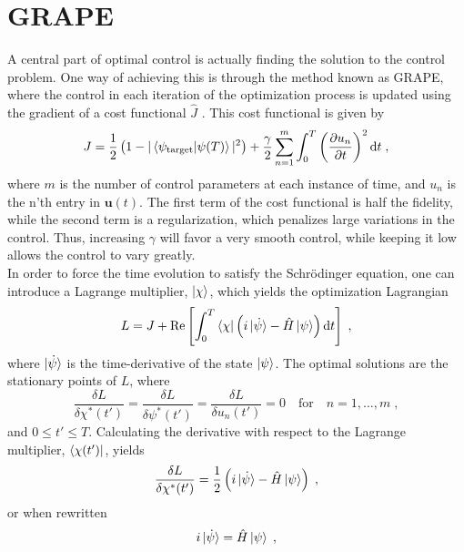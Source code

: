 \section{GRAPE}  %
A central part of optimal control is actually finding the solution to the control problem. One way of achieving this is through the method known as GRAPE, where the control in each iteration of the optimization process is updated using the gradient of a cost functional $\hat{J}$ \cite{QOCT}. This cost functional is given by
\begin{equation}
	J = \frac{1}{2} \left( 1-|\braket{\psi_{\mathrm{target}} | \psi (T)}|^2 \right) + \frac{\gamma}{2} \sum_{n=1}^{m} \int_{0}^{T} \left( \pdv{u_n}{t} \right)^2 \mathrm{d}t \; ,
\end{equation}
where $m$ is the number of control parameters at each instance of time, and $u_n$ is the n'th entry in $\boldsymbol{u}(t)$. The first term of the cost functional is half the fidelity, while the second term is a regularization, which penalizes large variations in the control. Thus, increasing $\gamma$ will favor a very smooth control, while keeping it low allows the control to vary greatly.\\
In order to force the time evolution to satisfy the Schrödinger equation, one can introduce a Lagrange multiplier, $\ket{\chi}$, which yields the optimization Lagrangian
\begin{equation}
	L = J + \Re \left[ \int_{0}^{T} \bra{\chi} \left( i \ket{\dot{\psi}} - \hat{H} \ket{\psi} \right) \mathrm{d}t \right] \; ,
\end{equation} 
where $\ket{\dot{\psi}}$ is the time-derivative of the state $\ket{\psi}$. The optimal solutions are the stationary points of $L$, where
\begin{equation}
	\frac{\delta L}{\delta \chi ^* (t')} = \frac{\delta L}{\delta \psi ^* (t')} = \frac{\delta L}{\delta u_n (t')} = 0 \quad \mathrm{for} \quad  n = 1, \ldots , m \; , \label{eq:statpoint}
\end{equation}
and $0 \leq t' \leq T$.
Calculating the derivative with respect to the Lagrange multiplier, $\bra{\chi (t')}$, yields
\begin{equation}
	\frac{\delta L}{\delta \chi ^* (t')} = \frac{1}{2} \left( i \ket{\dot{\psi}} -  \hat{H} \ket{\psi} \right) \; ,
\end{equation}
or when rewritten
\begin{equation}
	 i \ket{\dot{\psi}} =  \hat{H} \ket{\psi} \; ,
\end{equation}
